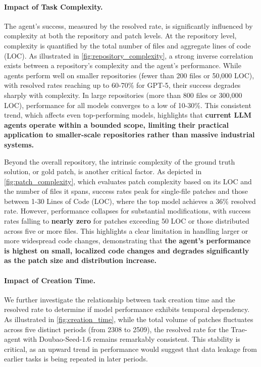 \paragraph{\textbf{Impact of Task Complexity.}}
The agent's success, measured by the resolved rate, is significantly influenced by complexity at both the repository and patch levels.
At the repository level, complexity is quantified by the total number of files and aggregate lines of code (LOC).
As illustrated in \cref{fig:repository_complexity}, a strong inverse correlation exists between a repository's complexity and the agent's performance.
While agents perform well on smaller repositories (fewer than 200 files or 50,000 LOC), with resolved rates reaching up to 60-70\% for GPT-5, their success degrades sharply with complexity.
In large repositories (more than 800 files or 300,000 LOC), performance for all models converges to a low of 10-30\%.
This consistent trend, which affects even top-performing models, highlights that \textbf{current LLM agents operate within a bounded scope, limiting their practical application to smaller-scale repositories rather than massive industrial systems.}



Beyond the overall repository, the intrinsic complexity of the ground truth solution, or gold patch, is another critical factor.
As depicted in \cref{fig:patch_complexity}, which evaluates patch complexity based on its LOC and the number of files it spans, success rates peak for single-file patches and those between 1-30 Lines of Code (LOC), where the top model achieves a 36\% resolved rate.
However, performance collapses for substantial modifications, with success rates falling to \textbf{nearly zero} for patches exceeding 50 LOC or those distributed across five or more files.
This highlights a clear limitation in handling larger or more widespread code changes, demonstrating that \textbf{the agent's performance is highest on small, localized code changes and degrades significantly as the patch size and distribution increase.}

\paragraph{\textbf{Impact of Creation Time.}}
We further investigate the relationship between task creation time and the resolved rate to determine if model performance exhibits temporal dependency. As illustrated in \cref{fig:creation_time}, while the total volume of patches fluctuates across five distinct periods (from 2308 to 2509), the resolved rate for the Trae-agent with Doubao-Seed-1.6 remains remarkably consistent.
This stability is critical, as an upward trend in performance would suggest that data leakage from earlier tasks is being repeated in later periods.

